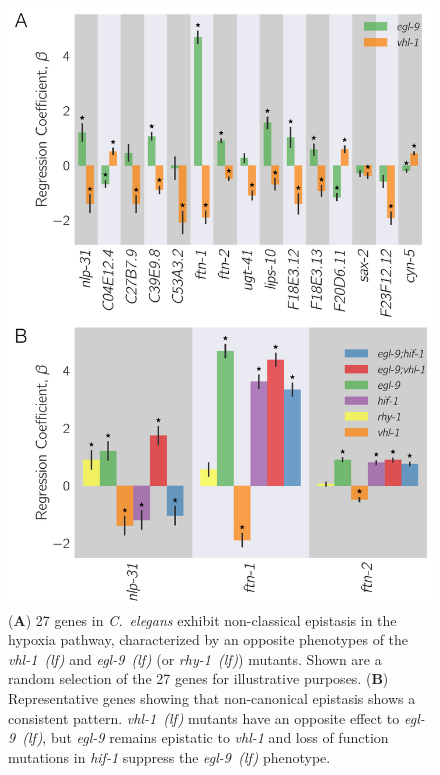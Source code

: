 \documentclass[9pt,twocolumn,twoside]{pnas-new}
\newcommand{\cel}{\emph{C.~elegans}}
\newcommand{\gene}[1]{\emph{#1}}
\newcommand{\egl}{\emph{egl-9~(lf)}}
\newcommand{\rhy}{\emph{rhy-1~(lf)}}
\newcommand{\vhl}{\emph{vhl-1~(lf)}}
\begin{document}
\begin{figure}[tbhp]
\centering
\includegraphics[width=\linewidth]{figs/hif1oh_epistasis.pdf}
\caption{
(\textbf{A}) 27 genes in \cel{} exhibit non-classical epistasis in the hypoxia
pathway, characterized by an opposite phenotypes of the \vhl{} and \egl{} (or
\rhy{}) mutants. Shown are a random selection of the 27 genes for illustrative
purposes.
(\textbf{B}) Representative genes showing that non-canonical epistasis shows a
consistent pattern. \vhl{} mutants have an opposite effect to \egl{}, but
\gene{egl-9} remains epistatic to \gene{vhl-1} and loss of function mutations in
\gene{hif-1} suppress the \egl{} phenotype.
}
\label{fig:hif1oh}
\end{figure}
\end{document}
